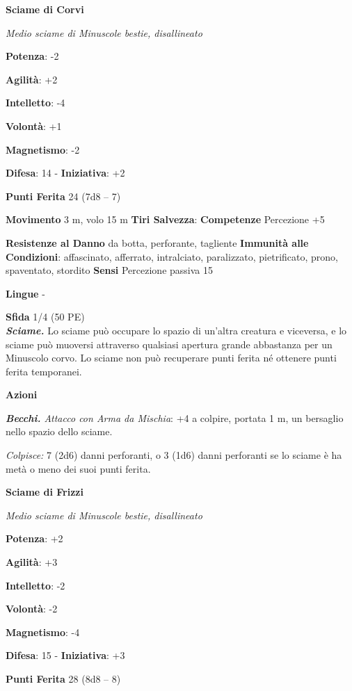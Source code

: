 \begin{multicols}{2}
\textbf{Sciame di Corvi}

\emph{Medio sciame di Minuscole bestie, disallineato}

\textbf{Potenza}: -2

\textbf{Agilità}: +2

\textbf{Intelletto}: -4

\textbf{Volontà}: +1

\textbf{Magnetismo}: -2

\textbf{Difesa}: 14 - \textbf{Iniziativa}: +2

\textbf{Punti Ferita} 24 (7d8 -- 7)

\textbf{Movimento} 3 m, volo 15 m
\textbf{Tiri Salvezza}:
\textbf{Competenze} Percezione +5

\textbf{Resistenze al Danno} da botta, perforante, tagliente
\textbf{Immunità alle Condizioni}: affascinato, afferrato, intralciato,
paralizzato, pietrificato, prono, spaventato, stordito \textbf{Sensi}
Percezione passiva 15

\textbf{Lingue} -

\textbf{Sfida} 1/4 (50 PE)\smallskip\\

\emph{\textbf{Sciame.}} Lo sciame può occupare lo spazio di un'altra
creatura e viceversa, e lo sciame può muoversi attraverso qualsiasi
apertura grande abbastanza per un Minuscolo corvo. Lo sciame non può
recuperare punti ferita né ottenere punti ferita temporanei.

\smallskip\textbf{Azioni}

\emph{\textbf{Becchi.} Attacco con Arma da Mischia}: +4 a colpire,
portata 1 m, un bersaglio nello spazio dello sciame.

\emph{Colpisce:} 7 (2d6) danni perforanti, o 3 (1d6) danni perforanti se
lo sciame è ha metà o meno dei suoi punti ferita.



\textbf{Sciame di Frizzi}

\emph{Medio sciame di Minuscole bestie, disallineato}

\textbf{Potenza}: +2

\textbf{Agilità}: +3

\textbf{Intelletto}: -2

\textbf{Volontà}: -2

\textbf{Magnetismo}: -4

\textbf{Difesa}: 15 - \textbf{Iniziativa}: +3

\textbf{Punti Ferita} 28 (8d8 -- 8)


\end{multicols}
